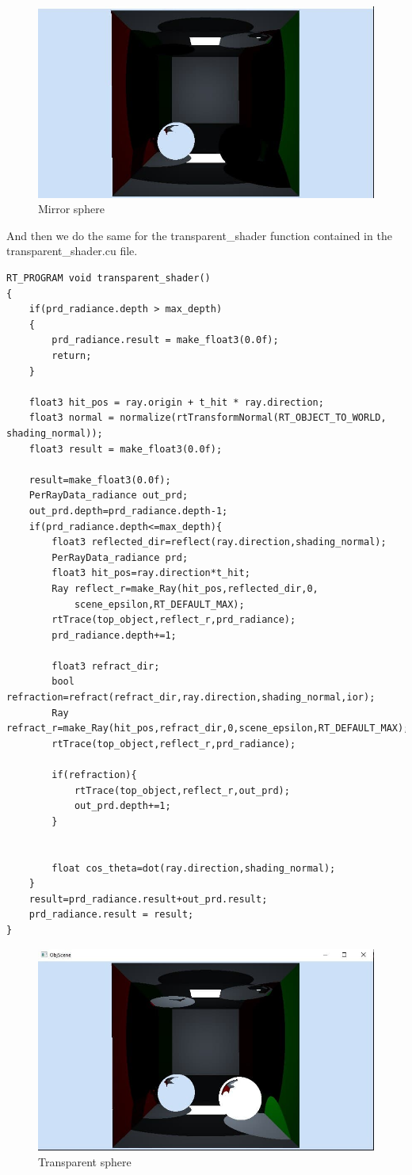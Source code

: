 \begin{figure}[H]
	\centering
	\includegraphics[scale=\imagescale]{images/project/9}
	\caption{Mirror sphere}
	\label{fig:mirror_ball}
\end{figure}
And then we do the same for the transparent\_shader function contained in the transparent\_shader.cu file.
\begin{lstlisting}
RT_PROGRAM void transparent_shader()
{
	if(prd_radiance.depth > max_depth)
	{
		prd_radiance.result = make_float3(0.0f);
		return;
	}
	
	float3 hit_pos = ray.origin + t_hit * ray.direction;
	float3 normal = normalize(rtTransformNormal(RT_OBJECT_TO_WORLD, shading_normal));
	float3 result = make_float3(0.0f);
	
	result=make_float3(0.0f);
	PerRayData_radiance out_prd;
	out_prd.depth=prd_radiance.depth-1;
	if(prd_radiance.depth<=max_depth){
		float3 reflected_dir=reflect(ray.direction,shading_normal);
		PerRayData_radiance prd;
		float3 hit_pos=ray.direction*t_hit;
		Ray reflect_r=make_Ray(hit_pos,reflected_dir,0,
			scene_epsilon,RT_DEFAULT_MAX);
		rtTrace(top_object,reflect_r,prd_radiance);
		prd_radiance.depth+=1;
		
		float3 refract_dir;
		bool refraction=refract(refract_dir,ray.direction,shading_normal,ior);
		Ray refract_r=make_Ray(hit_pos,refract_dir,0,scene_epsilon,RT_DEFAULT_MAX);
		rtTrace(top_object,reflect_r,prd_radiance);
		
		if(refraction){
			rtTrace(top_object,reflect_r,out_prd);
			out_prd.depth+=1;
		}	  
		
		
		float cos_theta=dot(ray.direction,shading_normal);
	}
	result=prd_radiance.result+out_prd.result;
	prd_radiance.result = result;
}
\end{lstlisting}

\begin{figure}[H]
	\centering
	\includegraphics[scale=\imagescale]{images/project/10}
	\caption{Transparent sphere}
	\label{fig:transparent_sphere}
\end{figure}